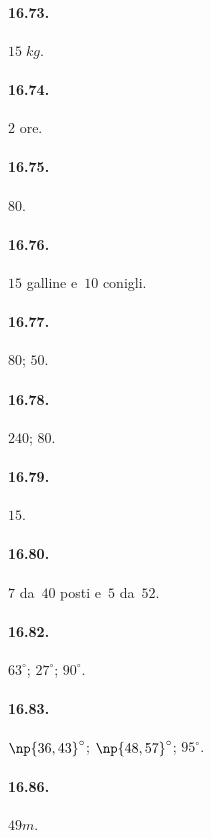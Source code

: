 \begin{multicols}{2}
\paragraph{16.73.}
$15\;\unit{kg}$.

\paragraph{16.74.}
$2$ ore.

\paragraph{16.75.}
$80$.

\paragraph{16.76.}
$15$ galline e~$10$ conigli.

\paragraph{16.77.}
$80$; $50$.

\paragraph{16.78.}
$240$; $80$.

\paragraph{16.79.}
$15$.

\paragraph{16.80.}
$7$ da~$40$ posti e~$5$ da~$52$.

\paragraph{16.82.}
$63^{\circ}$; $27^{\circ}$; $90^{\circ}$.

\paragraph{16.83.}
$\np{36,43}^{\circ}$; $\np{48,57}^{\circ}$; $95^{\circ}$.

\paragraph{16.86.}
$49\unit{m}$.


\end{multicols}
